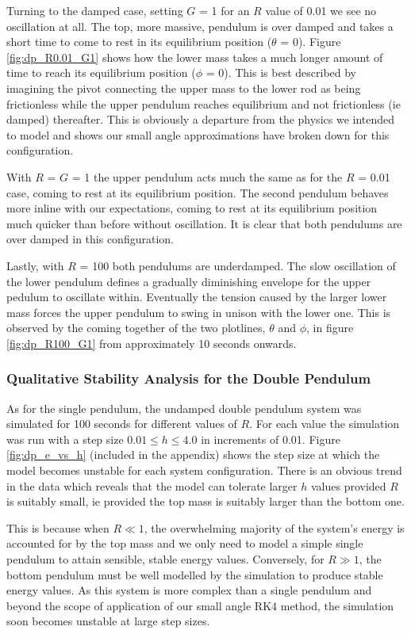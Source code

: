 \documentclass[11pt]{article}
\begin{document}
Turning to the damped case, setting $G$ = 1 for an $R$ value of 0.01 we see no oscillation at all. The top, more massive, pendulum is over damped and takes a short time to come to rest in its equilibrium position ($\theta$ = 0). Figure \ref{fig:dp_R0.01_G1} shows how the lower mass takes a much longer amount of time to reach its equilibrium position ($\phi$ = 0). This is best described by imagining the pivot connecting the upper mass to the lower rod as being frictionless while the upper pendulum reaches equilibrium and not frictionless (ie damped) thereafter. This is obviously a departure from the physics we intended to model and shows our small angle approximations have broken down for this configuration.

With $R$ = $G$ = 1 the upper pendulum acts much the same as for the $R$ = 0.01 case, coming to rest at its equilibrium position. The second pendulum behaves more inline with our expectations, coming to rest at its equilibrium position much quicker than before without oscillation. It is clear that both pendulums are over damped in this configuration.

Lastly, with $R$ = 100 both pendulums are underdamped. The slow oscillation of the lower pendulum defines a gradually diminishing envelope for the upper pedulum to oscillate within. Eventually the tension caused by the larger lower mass forces the upper pendulum to swing in unison with the lower one. This is observed by the coming together of the two plotlines, $\theta$ and $\phi$, in figure \ref{fig:dp_R100_G1} from approximately 10 seconds onwards.

\subsubsection*{Qualitative Stability Analysis for the Double Pendulum}
As for the single pendulum, the undamped double pendulum system was simulated for 100 seconds for different values of $R$. For each value the simulation was run with a step size $0.01 \leq h \leq 4.0$ in increments of 0.01. Figure \ref{fig:dp_e_vs_h} (included in the appendix) shows the step size at which the model becomes unstable for each system configuration. There is an obvious trend in the data which reveals that the model can tolerate larger $h$ values provided $R$ is suitably small, ie provided the top mass is suitably larger than the bottom one.

This is because when $R \ll 1$, the overwhelming majority of the system's energy is accounted for by the top mass and we only need to model a simple single pendulum to attain sensible, stable energy values. Conversely, for $R \gg 1$, the bottom pendulum must be well modelled by the simulation to produce stable energy values. As this system is more complex than a single pendulum and beyond the scope of application of our small angle RK4 method, the simulation soon becomes unstable at large step sizes.
\end{document}
